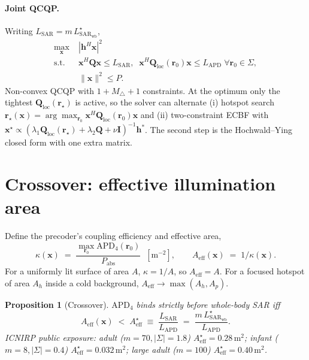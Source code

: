 \documentclass[journal]{IEEEtran}
\newtheorem{proposition}{Proposition}
\newcommand{\rr}{\bm{r}}
\newcommand{\xx}{\bm{x}}
\newcommand{\hh}{\bm{h}}
\newcommand{\SARwb}{\mathrm{SAR}_{\mathrm{wb}}}
\newcommand{\APD}{\mathrm{APD}}
\newcommand{\Pabs}{P_{\mathrm{abs}}}
\newcommand{\Q}{\mathbf{Q}}
\newcommand{\Qloc}{\Q_{\mathrm{loc}}}
\newcommand{\Aeff}{A_{\mathrm{eff}}}
\newcommand{\SAR}{\mathrm{SAR}}
\begin{document}
\paragraph{Joint QCQP.} Writing $L_{\SAR}=m\,L_{\SARwb}^\star$,
\begin{equation}\label{eq:P}
  \boxed{\;
  \begin{aligned}
    \max_{\xx}\;& |\hh^H\xx|^2 \\
    \text{s.t.}\;& \xx^H\Q\xx \le L_{\SAR}, \;\;
    \xx^H\Qloc(\rr_0)\xx \le L_{\APD}\;\forall\rr_0\!\in\!\Sigma, \\
    & \lVert\xx\rVert^2 \le P.
  \end{aligned}\;}
\end{equation}
Non-convex QCQP with $1+M_\triangle+1$ constraints. At the optimum
only the tightest $\Qloc(\rr_\star)$ is active, so the solver can
alternate (i) hotspot search
$\rr_\star(\xx)=\arg\max_{\rr_0}\xx^H\Qloc(\rr_0)\xx$ and
(ii) two-constraint ECBF with
$\xx^\star\!\propto\!(\lambda_1\Qloc(\rr_\star)+\lambda_2\Q+\nu\mathbf I)^{-1}\hh^*$.
The second step is the Hochwald--Ying closed form with one extra
matrix.

\section{Crossover: effective illumination area}\label{sec:crossover}

Define the precoder's coupling efficiency and effective area,
\begin{equation}\label{eq:kappa}
  \kappa(\xx)\;=\;\frac{\max_{\rr_0}\APD_4(\rr_0)}{\Pabs}\;\;[\mathrm m^{-2}],
  \qquad
  \Aeff(\xx)\;=\;1/\kappa(\xx).
\end{equation}
For a uniformly lit surface of area $A$, $\kappa\!=\!1/A$, so
$\Aeff\!=\!A$. For a focused hotspot of area $A_h$ inside a
cold background, $\Aeff\!\to\!\max(A_h,A_p)$.

\begin{proposition}[Crossover]\label{prop:cross}
$\APD_4$ binds strictly before whole-body SAR iff
\begin{equation}\label{eq:crossover}
  \Aeff(\xx)\;<\;\Aeff^\star\;\equiv\;\frac{L_{\SAR}}{L_{\APD}}
  \;=\;\frac{m\,L_{\SARwb}^\star}{L_{\APD}}.
\end{equation}
ICNIRP public exposure: adult ($m\!=\!70,|\Sigma|\!=\!1.8$)
$\Aeff^\star\!=\!0.28\,\mathrm m^2$; infant ($m\!=\!8,|\Sigma|\!=\!0.4$)
$\Aeff^\star\!=\!0.032\,\mathrm m^2$; large adult ($m\!=\!100$)
$\Aeff^\star\!=\!0.40\,\mathrm m^2$.
\end{proposition}
\end{document}
